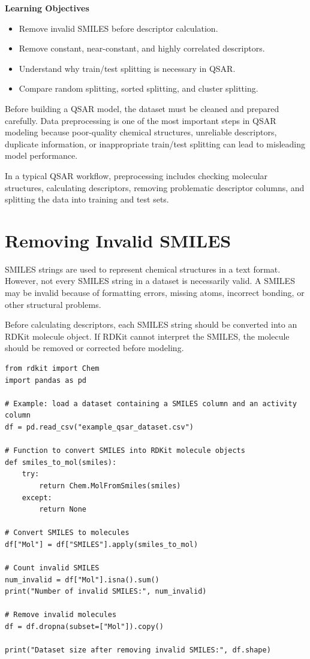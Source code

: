 \documentclass[11pt]{report}
\newenvironment{Important note}{\begin{quote}\color{red}\textbf{Important note:} }{\end{quote}}
\newenvironment{learningobjectives}
{\vspace{0.5em}\noindent\textbf{Learning Objectives}\begin{itemize}[leftmargin=*]}
{\end{itemize}\vspace{0.5em}}
\begin{document}
\begin{learningobjectives}
    \item Remove invalid SMILES before descriptor calculation.
    \item Remove constant, near-constant, and highly correlated descriptors.
    \item Understand why train/test splitting is necessary in QSAR.
    \item Compare random splitting, sorted splitting, and cluster splitting.
\end{learningobjectives}

Before building a QSAR model, the dataset must be cleaned and prepared carefully. Data preprocessing is one of the most important steps in QSAR modeling because poor-quality chemical structures, unreliable descriptors, duplicate information, or inappropriate train/test splitting can lead to misleading model performance.

In a typical QSAR workflow, preprocessing includes checking molecular structures, calculating descriptors, removing problematic descriptor columns, and splitting the data into training and test sets.

\section{Removing Invalid SMILES}

SMILES strings are used to represent chemical structures in a text format. However, not every SMILES string in a dataset is necessarily valid. A SMILES may be invalid because of formatting errors, missing atoms, incorrect bonding, or other structural problems.

Before calculating descriptors, each SMILES string should be converted into an RDKit molecule object. If RDKit cannot interpret the SMILES, the molecule should be removed or corrected before modeling.

\begin{lstlisting}[style=pythonstyle, caption={Removing invalid SMILES using RDKit.}]
from rdkit import Chem
import pandas as pd

# Example: load a dataset containing a SMILES column and an activity column
df = pd.read_csv("example_qsar_dataset.csv")

# Function to convert SMILES into RDKit molecule objects
def smiles_to_mol(smiles):
    try:
        return Chem.MolFromSmiles(smiles)
    except:
        return None

# Convert SMILES to molecules
df["Mol"] = df["SMILES"].apply(smiles_to_mol)

# Count invalid SMILES
num_invalid = df["Mol"].isna().sum()
print("Number of invalid SMILES:", num_invalid)

# Remove invalid molecules
df = df.dropna(subset=["Mol"]).copy()

print("Dataset size after removing invalid SMILES:", df.shape)
\end{lstlisting}
\end{document}
